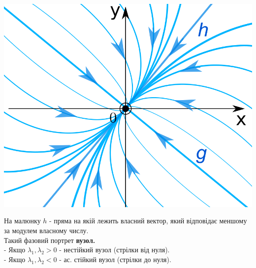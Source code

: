 \begin{center} \includegraphics[scale=0.3]{assets/lectures_recent-deaf1762.png} \end{center}

На малюнку $h$ - пряма на якій лежить власний вектор, який відповідає меншому за модулем власному числу.\\
Такий фазовий портрет \textbf{вузол.}\\
- Якщо $\lambda_1, \lambda_2 > 0$ - нестійкий вузол (стрілки від нуля).\\
- Якщо $\lambda_1, \lambda_2 < 0$ - ас. стійкий вузол (стрілки до нуля).

